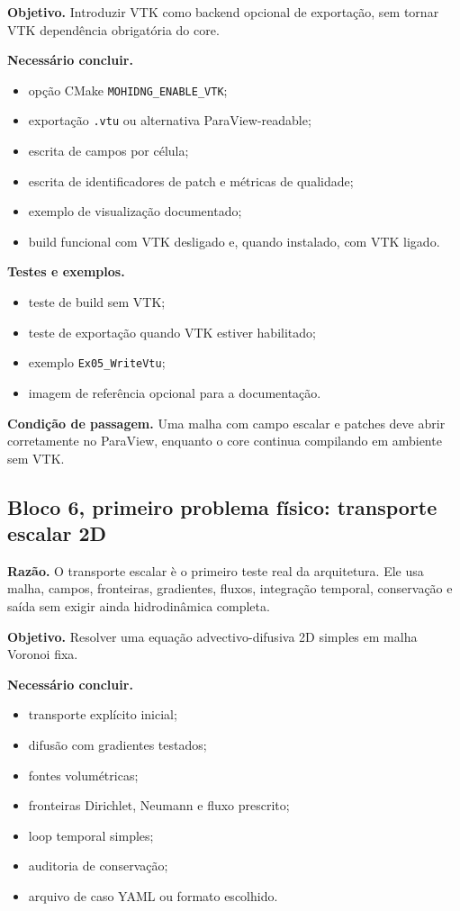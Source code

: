\documentclass[11pt,a4paper]{article}
\begin{document}
\textbf{Objetivo.} Introduzir VTK como backend opcional de exporta\c{c}\~ao, sem tornar VTK depend\^encia obrigat\'oria do core.

\textbf{Necess\'ario concluir.}
\begin{itemize}
  \item op\c{c}\~ao CMake \texttt{MOHIDNG\_ENABLE\_VTK};
  \item exporta\c{c}\~ao \texttt{.vtu} ou alternativa ParaView-readable;
  \item escrita de campos por c\'elula;
  \item escrita de identificadores de patch e m\'etricas de qualidade;
  \item exemplo de visualiza\c{c}\~ao documentado;
  \item build funcional com VTK desligado e, quando instalado, com VTK ligado.
\end{itemize}

\textbf{Testes e exemplos.}
\begin{itemize}
  \item teste de build sem VTK;
  \item teste de exporta\c{c}\~ao quando VTK estiver habilitado;
  \item exemplo \texttt{Ex05\_WriteVtu};
  \item imagem de refer\^encia opcional para a documenta\c{c}\~ao.
\end{itemize}

\textbf{Condi\c{c}\~ao de passagem.} Uma malha com campo escalar e patches deve abrir corretamente no ParaView, enquanto o core continua compilando em ambiente sem VTK.

\subsection*{Bloco 6, primeiro problema f\'isico: transporte escalar 2D}

\textbf{Raz\~ao.} O transporte escalar \`e o primeiro teste real da arquitetura. Ele usa malha, campos, fronteiras, gradientes, fluxos, integra\c{c}\~ao temporal, conserva\c{c}\~ao e sa\'ida sem exigir ainda hidrodin\^amica completa.

\textbf{Objetivo.} Resolver uma equa\c{c}\~ao advectivo-difusiva 2D simples em malha Voronoi fixa.

\textbf{Necess\'ario concluir.}
\begin{itemize}
  \item transporte expl\'icito inicial;
  \item difus\~ao com gradientes testados;
  \item fontes volum\'etricas;
  \item fronteiras Dirichlet, Neumann e fluxo prescrito;
  \item loop temporal simples;
  \item auditoria de conserva\c{c}\~ao;
  \item arquivo de caso YAML ou formato escolhido.
\end{itemize}
\end{document}

